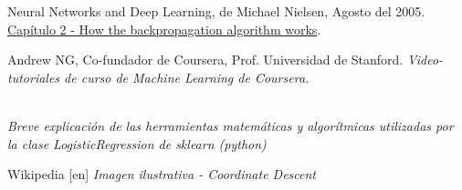 \documentclass[a4paper]{article}
\begin{document}


\pagestyle{fancy}
\lhead{\slshape \leftmark}
\chead{\scalebox{0.1}{asasasa}}
\renewcommand{\headrulewidth}{0.4pt}
\renewcommand{\footrulewidth}{0.4pt}

  \tableofcontents
  \clearpage

  


  

  

  




\clearpage
\begin{thebibliography}{3}

 Neural Networks and Deep Learning, de Michael Nielsen, Agosto del 2005. \href{Capítulo 2}{Capítulo 2 - How the backpropagation algorithm works}.

	Andrew NG, Co-fundador de Coursera, Prof. Universidad de Stanford. \textit{Video-tutoriales de curso de Machine Learning de Coursera.}

	\href{http://scikit-learn.org/stable/modules/linear\char`_model.html\#logistic-regression}  \\ \textit{Breve explicación de las herramientas matemáticas y algorítmicas utilizadas por la clase LogisticRegression de sklearn (python)}

	Wikipedia [en] \textit{Imagen ilustrativa - Coordinate Descent}
\end{thebibliography}
\end{document}
